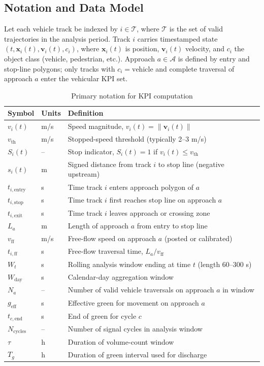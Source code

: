 \documentclass[11pt]{article}
\begin{document}
\subsection{Notation and Data Model}

Let each vehicle track be indexed by $i\in\mathcal{T}$, where $\mathcal{T}$ is the set of valid trajectories in the analysis period. Track $i$ carries timestamped state $(t,\mathbf{x}_i(t),\mathbf{v}_i(t),c_i)$, where $\mathbf{x}_i(t)$ is position, $\mathbf{v}_i(t)$ velocity, and $c_i$ the object class (vehicle, pedestrian, etc.). Approach $a\in\mathcal{A}$ is defined by entry and stop-line polygons; only tracks with $c_i=\text{vehicle}$ and complete traversal of approach $a$ enter the vehicular KPI set.

\begin{table}[htbp]
\centering
\caption{Primary notation for KPI computation}
\label{tab:notation}
\small
\begin{tabularx}{\textwidth}{@{}p{}p{}X@{}}
\toprule
Symbol & Units & Definition \\
\midrule
$v_i(t)$ & m/s & Speed magnitude, $v_i(t)=\lVert\mathbf{v}_i(t)\rVert$ \\
$v_{\mathrm{th}}$ & m/s & Stopped-speed threshold (typically 2--3 m/s) \\
$S_i(t)$ & -- & Stop indicator, $S_i(t)=1$ if $v_i(t)\leq v_{\mathrm{th}}$ \\
$s_i(t)$ & m & Signed distance from track $i$ to stop line (negative upstream) \\
$t_{i,\mathrm{entry}}$ & s & Time track $i$ enters approach polygon of $a$ \\
$t_{i,\mathrm{stop}}$ & s & Time track $i$ first reaches stop line on approach $a$ \\
$t_{i,\mathrm{exit}}$ & s & Time track $i$ leaves approach or crossing zone \\
$L_a$ & m & Length of approach $a$ from entry to stop line \\
$v_{\mathrm{ff}}$ & m/s & Free-flow speed on approach $a$ (posted or calibrated) \\
$t_{i,\mathrm{ff}}$ & s & Free-flow traversal time, $L_a/v_{\mathrm{ff}}$ \\
$W_t$ & s & Rolling analysis window ending at time $t$ (length 60--300 s) \\
$W_{\mathrm{day}}$ & s & Calendar-day aggregation window \\
$N_a$ & -- & Number of valid vehicle traversals on approach $a$ in window \\
$g_{\mathrm{eff}}$ & s & Effective green for movement on approach $a$ \\
$t_{c,\mathrm{end}}$ & s & End of green for cycle $c$ \\
$N_{\mathrm{cycles}}$ & -- & Number of signal cycles in analysis window \\
$\tau$ & h & Duration of volume-count window \\
$T_g$ & h & Duration of green interval used for discharge \\
\bottomrule
\end{tabularx}
\end{table}
\end{document}
